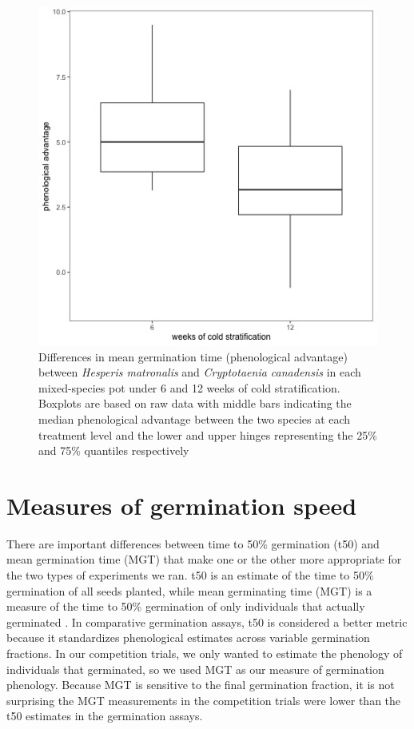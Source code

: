 \documentclass{article}
\begin{document}
\begin{figure}[hp]
    \centering
\includegraphics[width=.7\textwidth]{..//figure/priority_treat.jpeg}
   \caption{Differences in mean germination time (phenological advantage) between \textit{Hesperis matronalis} and \textit{Cryptotaenia canadensis} in each mixed-species pot under 6 and 12 weeks of cold stratification. Boxplots are based on raw data with middle bars indicating the median phenological advantage between the two species at each treatment level and the lower and upper hinges representing the 25\% and 75\% quantiles respectively} 
   \label{fig:MGTsup}
\end{figure}

\pagebreak
\section*{Measures of germination speed}
There are important differences between time to 50\% germination (t50) and mean germination time (MGT) that make one or the other more appropriate for the two types of experiments we ran. t50 is an estimate of the time to 50\% germination of all seeds planted, while mean germinating time (MGT) is a measure of the time to 50\% germination of only individuals that actually germinated \citep{Soltani:2015aa}. In comparative germination assays, t50 is considered a better metric because it standardizes phenological estimates across variable germination fractions. In our competition trials, we only wanted to estimate the phenology of individuals that germinated, so we used MGT as our measure of germination phenology. Because MGT is sensitive to the final germination fraction, it is not surprising the MGT measurements in the competition trials  were lower than the t50 estimates in the germination assays.


\end{document}
